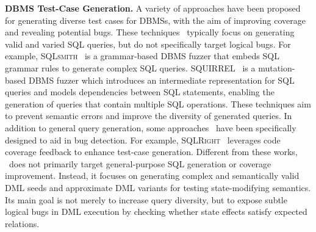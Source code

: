 \textbf{DBMS Test-Case Generation.}
A variety of approaches have been proposed for generating diverse test cases for DBMSs, with the aim of improving coverage and revealing potential bugs. 
These techniques~\cite{sqlsmith,zhong2020squirrel,fu2022griffin,jiang2023dynsql,lin2025qtran} typically focus on generating valid and varied SQL queries, but do not specifically target logical bugs. 
For example, \textsc{SQLsmith}~\cite{sqlsmith} is a grammar-based DBMS fuzzer that embeds SQL grammar rules to generate complex SQL queries. 
\textsc{SQUIRREL}~\cite{zhong2020squirrel} is a mutation-based DBMS fuzzer which introduces an intermediate representation for SQL queries and models dependencies between SQL statements, enabling the generation of queries that contain multiple SQL operations. 
These techniques aim to prevent semantic errors and improve the diversity of generated queries. 
In addition to general query generation, some approaches~\cite{liang2022detecting,ba2023testing} have been specifically designed to aid in bug detection. 
For example, \textsc{SQLRight}~\cite{liang2022detecting} leverages code coverage feedback to enhance test-case generation. 
%
Different from these works, \toolname\ does not primarily target general-purpose SQL generation or coverage improvement. 
Instead, it focuses on generating complex and semantically valid DML seeds and approximate DML variants for testing state-modifying semantics. 
Its main goal is not merely to increase query diversity, but to expose subtle logical bugs in DML execution by checking whether state effects satisfy expected relations. 



